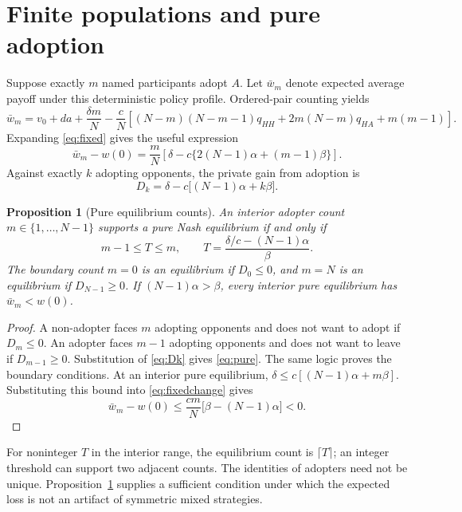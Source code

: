 \documentclass[11pt,a4paper]{article}
\newtheorem{proposition}[theorem]{Proposition}
\theoremstyle{definition}
\theoremstyle{remark}
\begin{document}
\section{Finite populations and pure adoption}
Suppose exactly $m$ named participants adopt $A$. Let $\bar w_m$ denote expected average payoff under this deterministic policy profile. Ordered-pair counting yields
\begin{equation}\label{eq:fixed}
 \bar w_m=v_0+da+\frac{\delta m}{N}
 -\frac{c}{N}\left[(N-m)(N-m-1)q_{HH}
 +2m(N-m)q_{HA}+m(m-1)\right].
\end{equation}
Expanding \eqref{eq:fixed} gives the useful expression
\begin{equation}\label{eq:fixedchange}
 \bar w_m-w(0)=\frac{m}{N}
 \left[\delta-c\{2(N-1)\alpha+(m-1)\beta\}\right].
\end{equation}
Against exactly $k$ adopting opponents, the private gain from adoption is
\begin{equation}\label{eq:Dk}
 D_k=\delta-c\bigl[(N-1)\alpha+k\beta\bigr].
\end{equation}

\begin{proposition}[Pure equilibrium counts]\label{prop:pure}
An interior adopter count $m\in\{1,\ldots,N-1\}$ supports a pure Nash equilibrium if and only if
\begin{equation}\label{eq:pure}
 m-1\leq T\leq m,\qquad
 T=\frac{\delta/c-(N-1)\alpha}{\beta}.
\end{equation}
The boundary count $m=0$ is an equilibrium if $D_0\leq0$, and $m=N$ is an equilibrium if $D_{N-1}\geq0$. If $(N-1)\alpha>\beta$, every interior pure equilibrium has $\bar w_m<w(0)$.
\end{proposition}
\begin{proof}
A non-adopter faces $m$ adopting opponents and does not want to adopt if $D_m\leq0$. An adopter faces $m-1$ adopting opponents and does not want to leave if $D_{m-1}\geq0$. Substitution of \eqref{eq:Dk} gives \eqref{eq:pure}. The same logic proves the boundary conditions. At an interior pure equilibrium, $\delta\leq c[(N-1)\alpha+m\beta]$. Substituting this bound into \eqref{eq:fixedchange} gives
\[
 \bar w_m-w(0)\leq\frac{cm}{N}\bigl[\beta-(N-1)\alpha\bigr]<0.
\]
\end{proof}
For noninteger $T$ in the interior range, the equilibrium count is $\lceil T\rceil$; an integer threshold can support two adjacent counts. The identities of adopters need not be unique. Proposition~\ref{prop:pure} supplies a sufficient condition under which the expected loss is not an artifact of symmetric mixed strategies.
\end{document}
